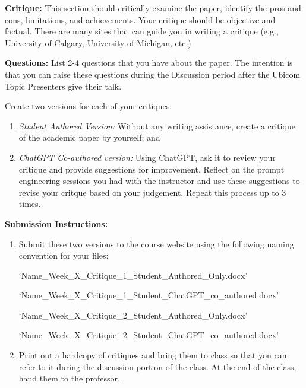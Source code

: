 \hfill \break
\textbf{Critique:}
This section should critically examine the paper, identify the pros and cons, limitations, and achievements.  Your critique should be objective and factual.  There are many sites that can guide you in writing a critique (e.g.,  
\href{https://www.ucalgary.ca/live-uc-ucalgary-site/sites/default/files/teams/9/critique-or-reviews-of-research-articles-academic-genre.pdf}{University of Calgary}, \href{https://open.umich.edu/sites/default/files/downloads/Topic8Assignment-CritiqueArticle.pdf}{University of Michigan}, etc.)

\hfill \break
\textbf{Questions: }
List 2-4 questions that you have about the paper.  The intention is that you can raise these questions during the Discussion period after the Ubicom Topic Presenters give their talk.



\hfill \break
Create two versions for each of your critiques:  
\begin{enumerate}
	\item \textit{Student Authored Version:} Without any writing assistance, create a critique of the academic paper by yourself; and 
	\item \textit{ChatGPT Co-authored version:} Using ChatGPT, ask it to review your critique and provide suggestions for improvement. Reflect on the prompt engineering sessions you had with the instructor and use these suggestions to revise your critque based on your judgement.  Repeat this process up to 3 times.   
\end{enumerate}

\hfill \break
\textbf{Submission Instructions:}

\begin{enumerate}
	\item Submit these two versions to the course website using the following naming convention for your files:
	

	\footnotesize{`Name\_Week\_X\_Critique\_1\_Student\_Authored\_Only.docx'}
	
	`Name\_Week\_X\_Critique\_1\_Student\_ChatGPT\_co\_authored.docx'

	\hfill

	`Name\_Week\_X\_Critique\_2\_Student\_Authored\_Only.docx'
	
	`Name\_Week\_X\_Critique\_2\_Student\_ChatGPT\_co\_authored.docx'

	\normalsize
	\hfill
	
	\item Print out a hardcopy of critiques and bring them to class so that you can refer to it during the discussion portion of the class.  At the end of the class, hand them to the professor.  
\end{enumerate}